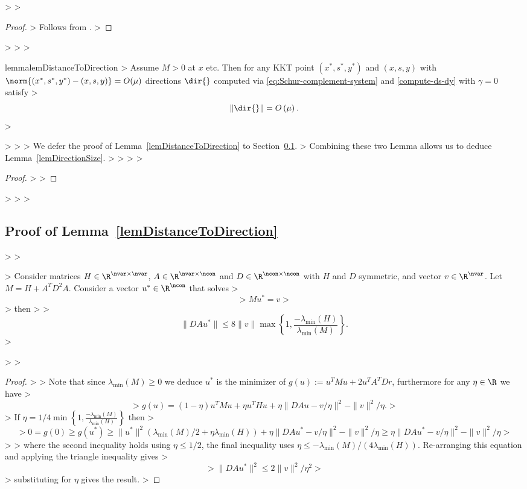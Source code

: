 > 
> \begin{proof}
> Follows from \citet{hager1999stability}.
> \end{proof}
> 
> 
> \begin{restatable}{lemma}{lemDistanceToDirection}\label{lemDistanceToDirection}
> Assume $M > 0$ at $x$ etc. Then for any KKT point $(x^{*}, s^{*}, y^{*})$ and $(x,s,y)$ with $\norm{ (x^{*}, s^{*}, y^{*}) - (x,s,y)} = O(\mu)$ directions $\dir{}$ computed via \eqref{eq:Schur-complement-system} and \eqref{compute-ds-dy} with  $\gamma = 0$ satisfy 
> $$\| \dir{} \| = O \left( \mu \right).$$
> \end{restatable}
> 
> 
> We defer the proof of Lemma~\ref{lemDistanceToDirection} to Section~\ref{sec:lemDistanceToDirection}.
> Combining these two Lemma allows us to deduce Lemma~\ref{lemDirectionSize}.
> 
> \lemDirectionSize*
> 
> \begin{proof}
> 
> \end{proof}
> 
> 
> \subsection{Proof of Lemma~\ref{lemDistanceToDirection}}\label{sec:lemDistanceToDirection}
> 
> \begin{lemma}\label{matrix-bound-lemma}
> Consider matrices $H  \in \R^{\nvar \times \nvar}$, $A \in \R^{\nvar \times \ncon}$ and $D \in \R^{\ncon \times \ncon}$ with $H$ and $D$ symmetric, and vector $v \in \R^{\nvar}$. Let $M = H + A^T D^2 A$. Consider a vector $u^{*} \in \R^{\ncon}$ that solves
> $$
> M u^{*} =  v
> $$
> then 
> %
> $$\| D A u^{*} \| \le 8 \| v \| \max\left\{1, \frac{- \lambda_{\min}(H)}{\lambda_{\min}(M)} \right\}.$$
> \end{lemma}
> 
> \begin{proof}
> 
> Note that since $\lambda_{\min}(M) \ge 0$ we deduce $u^{*}$ is the minimizer of $g(u) := u^T M u +  2 u^T A^T D r$, furthermore for any $\eta \in \R$ we have
> $$
> g(u)  = (1 - \eta) u^T M u + \eta u^T H u + \eta \| D A u -  v / \eta \|^2 - \| v \|^2 / \eta.
> $$
> If $\eta = 1/4 \min\left\{1,  \frac{-  \lambda_{\min}(M)}{\lambda_{\min}(H)} \right\}$ then
> $$
> 0 = g(0) \ge g(u^{*}) \ge \| u^{*} \|^2 ( \lambda_{\min}(M) / 2 + \eta \lambda_{\min}(H) ) + \eta \| D A u^{*}  -  v / \eta \|^2 - \| v \|^2 / \eta \ge   \eta \| D A u^{*}  -  v / \eta \|^2  - \| v \|^2 / \eta 
> $$
> %
> where the second inequality holds using $\eta \le 1/2$, the final inequality uses $\eta \le -\lambda_{\min}(M) / (4 \lambda_{\min}(H))$. Re-arranging this equation and applying the triangle inequality gives
> $$
> \| D A u^{*} \|^2 \le 2 \| v \|^2 / \eta^2
> $$
> substituting for $\eta$ gives the result.
> \end{proof}
